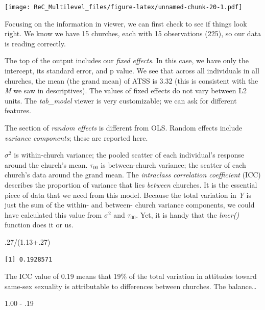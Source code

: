 \documentclass[
  11pt,
]{book}
\newenvironment{Shaded}{\begin{snugshade}}{\end{snugshade}}
\newcommand{\DecValTok}[1]{\textcolor[rgb]{0.00,0.00,0.81}{#1}}
\newcommand{\FloatTok}[1]{\textcolor[rgb]{0.00,0.00,0.81}{#1}}
\newcommand{\NormalTok}[1]{#1}
\newcommand{\SpecialCharTok}[1]{\textcolor[rgb]{0.00,0.00,0.00}{#1}}
\begin{document}
\texttt{[image: ReC\_Multilevel\_files/figure-latex/unnamed-chunk-20-1.pdf]}

Focusing on the information in viewer, we can first check to see if things look right. We know we have 15 churches, each with 15 observations (225), so our data is reading correctly.

The top of the output includes our \emph{fixed effects}. In this case, we have only the intercept, its standard error, and p value. We see that across all individuals in all churches, the mean (the grand mean) of ATSS is 3.32 (this is consistent with the \emph{M} we saw in descriptives). The values of fixed effects do not vary between L2 units. The \emph{tab\_model} viewer is very customizable; we can ask for different features.

The section of \emph{random effects} is different from OLS. Random effects include \emph{variance components}; these are reported here.

\(\sigma^{2}\) is within-church variance; the pooled scatter of each individual's response around the church's mean.
\(\tau _{00}\) is between-church variance; the scatter of each church's data around the grand mean.
The \emph{intraclass correlation coefficient} (ICC) describes the proportion of variance that lies \emph{between} churches. It is the essential piece of data that we need from this model. Because the total variation in \emph{Y} is just the sum of the within- and between- church variance components, we could have calculated this value from \(\sigma^{2}\) and \(\tau _{00}\). Yet, it is handy that the \emph{lmer()} function does it or us.

\begin{Shaded}
\begin{Highlighting}[]
\NormalTok{.}\DecValTok{27}\SpecialCharTok{/}\NormalTok{(}\FloatTok{1.13+.27}\NormalTok{)}
\end{Highlighting}
\end{Shaded}

\begin{verbatim}
[1] 0.1928571
\end{verbatim}

The ICC value of 0.19 means that 19\% of the total variation in attitudes toward same-sex sexuality is attributable to differences between churches. The balance\ldots{}

\begin{Shaded}
\begin{Highlighting}[]
\FloatTok{1.00} \SpecialCharTok{{-}}\NormalTok{ .}\DecValTok{19}
\end{Highlighting}
\end{Shaded}
\end{document}
